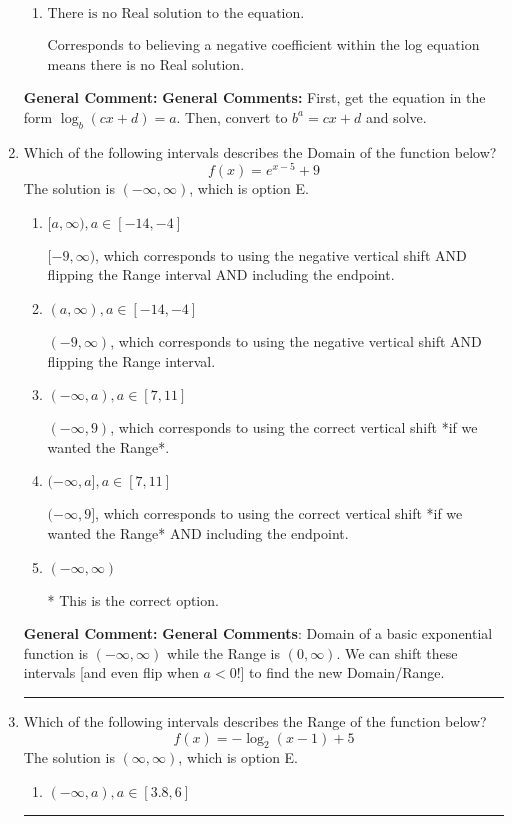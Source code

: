 \documentclass{extbook}[14pt]
\newcommand{\litem}[1]{\item #1

\rule{\textwidth}{0.4pt}}
\begin{document}
\begin{enumerate}
{\begin{enumerate}[label=\Alph*.]
$x = 3.500$, which corresponds to reversing the base and exponent when converting and reversing the value with $x$.
\item \( \text{There is no Real solution to the equation.} \)

Corresponds to believing a negative coefficient within the log equation means there is no Real solution.
\end{enumerate}

\textbf{General Comment:} \textbf{General Comments:} First, get the equation in the form $\log_b{(cx+d)} = a$. Then, convert to $b^a = cx+d$ and solve.
}
\litem{
Which of the following intervals describes the Domain of the function below?
\[ f(x) = e^{x-5}+9 \]The solution is \( (-\infty, \infty) \), which is option E.\begin{enumerate}[label=\Alph*.]
\item \( [a, \infty), a \in [-14, -4] \)

$[-9, \infty)$, which corresponds to using the negative vertical shift AND flipping the Range interval AND including the endpoint.
\item \( (a, \infty), a \in [-14, -4] \)

$(-9, \infty)$, which corresponds to using the negative vertical shift AND flipping the Range interval.
\item \( (-\infty, a), a \in [7, 11] \)

$(-\infty, 9)$, which corresponds to using the correct vertical shift *if we wanted the Range*.
\item \( (-\infty, a], a \in [7, 11] \)

$(-\infty, 9]$, which corresponds to using the correct vertical shift *if we wanted the Range* AND including the endpoint.
\item \( (-\infty, \infty) \)

* This is the correct option.
\end{enumerate}

\textbf{General Comment:} \textbf{General Comments}: Domain of a basic exponential function is $(-\infty, \infty)$ while the Range is $(0, \infty)$. We can shift these intervals [and even flip when $a<0$!] to find the new Domain/Range.
}
\litem{
Which of the following intervals describes the Range of the function below?
\[ f(x) = -\log_2{(x-1)}+5 \]The solution is \( (\infty, \infty) \), which is option E.\begin{enumerate}[label=\Alph*.]
\item \( (-\infty, a), a \in [3.8, 6] \)


\end{enumerate}}
\end{enumerate}
\end{document}
